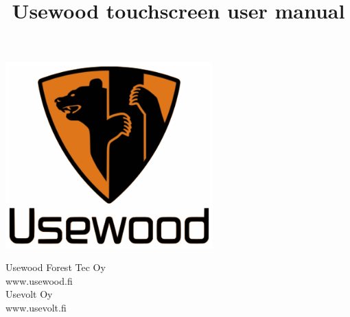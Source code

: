 \documentclass[12pt,a4paper,english]{uvmanual}
\title{Usewood touchscreen user manual}
\begin{document}
%	
\thispagestyle{empty}
\vspace*{-1cm}\noindent
\begin{center}
\includegraphics[width=8cm]{img/uw_logo_color.png}   %
\end{center}
\vspace{1cm}
\begin{center}
\end{center}



\vspace{2.8cm}
\maketitle
\vspace{2.8cm}


\begin{minipage}[c]{8.8cm}
  \begin{spacing}{1.0}
    \textsf{Usewood Forest Tec Oy}\\
    \textsf{www.usewood.fi}\\
    \textsf{Usevolt Oy}\\
    \textsf{www.usevolt.fi}\\
  \end{spacing}
\end{minipage}

\if@twoside
\clearpage
\fi

\setcounter{page}{0} %
\end{document}
